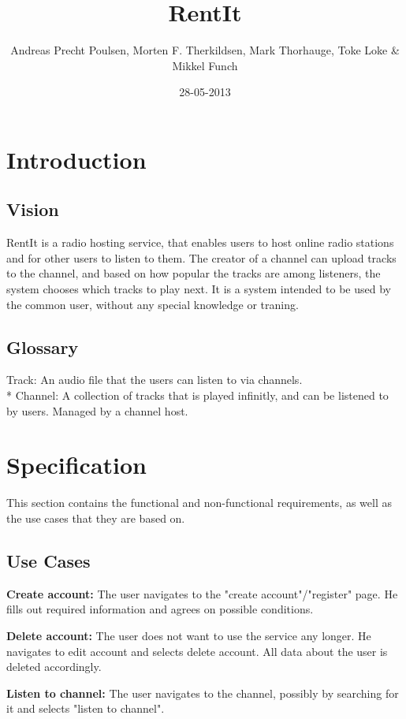 \documentclass[a4paper,11pt,report]{article}
\begin{document}
\title{RentIt}
\author{Andreas Precht Poulsen, Morten F. Therkildsen, Mark Thorhauge, Toke Loke \& Mikkel Funch}
\date{28-05-2013}
\maketitle

\section{Introduction}
\subsection{Vision}
RentIt is a radio hosting service, that enables users to host online radio stations and for other users to listen to them. The creator of a channel can upload tracks to the channel, and based on how popular the tracks are among listeners, the system chooses which tracks to play next.
It is a system intended to be used by the common user, without any special knowledge or traning.
\subsection{Glossary}
Track: An audio file that the users can listen to via channels. \\*
Channel: A collection of tracks that is played infinitly, and can be listened to by users. Managed by a channel host.

\section{Specification}
This section contains the functional and non-functional requirements, as well as the use cases that they are based on.
\subsection{Use Cases}
\textbf{Create account:}
The user navigates to the "create account"/"register" page. He fills out required information and agrees on possible conditions.

\textbf{Delete account:}
The user does not want to use the service any longer. He navigates to edit account and selects delete account. All data about the user is deleted accordingly.

\textbf{Listen to channel:}
The user navigates to the channel, possibly by searching for it and selects "listen to channel".
\end{document}
